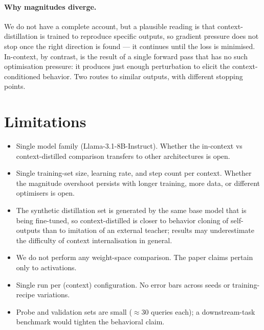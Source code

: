 \documentclass{article}
\begin{document}
\paragraph{Why magnitudes diverge.}
We do not have a complete account, but a plausible reading is that
context-distillation is trained to reproduce specific outputs, so
gradient pressure does not stop once the right direction is found ---
it continues until the loss is minimised. In-context, by contrast, is
the result of a single forward pass that has no such optimisation
pressure: it produces just enough perturbation to elicit the
context-conditioned behavior. Two routes to similar outputs, with
different stopping points.

\section{Limitations}
\label{sec:limitations}

\begin{itemize}
\item Single model family (Llama-3.1-8B-Instruct). Whether the
  in-context vs context-distilled comparison transfers to other
  architectures is open.
\item Single training-set size, learning rate, and step count per
  context. Whether the magnitude overshoot persists with longer
  training, more data, or different optimisers is open.
\item The synthetic distillation set is generated by the same base
  model that is being fine-tuned, so context-distilled is closer to
  behavior cloning of self-outputs than to imitation of an external
  teacher; results may underestimate the difficulty of context
  internalisation in general.
\item We do not perform any weight-space comparison. The paper claims
  pertain only to activations.
\item Single run per (context) configuration. No error bars across
  seeds or training-recipe variations.
\item Probe and validation sets are small ($\approx 30$ queries
  each); a downstream-task benchmark would tighten the behavioral
  claim.
\end{itemize}




\newpage

\end{document}
